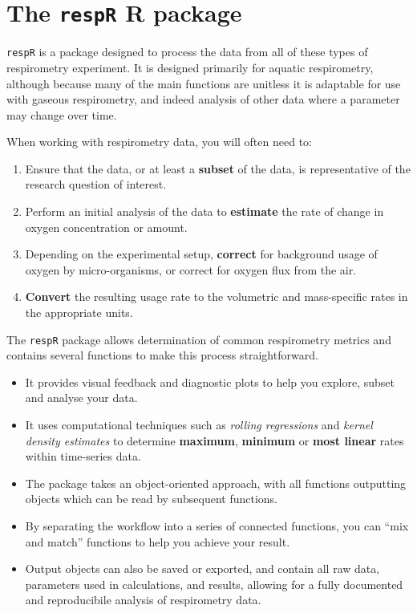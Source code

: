 \documentclass[]{book}
\providecommand{\tightlist}{%
  \setlength{\itemsep}{0pt}\setlength{\parskip}{0pt}}
\begin{document}
\section{\texorpdfstring{The \texttt{respR} R
package}{The respR R package}}\label{the-respr-r-package}

\texttt{respR} is a package designed to process the data from all of
these types of respirometry experiment. It is designed primarily for
aquatic respirometry, although because many of the main functions are
unitless it is adaptable for use with gaseous respirometry, and indeed
analysis of other data where a parameter may change over time.

When working with respirometry data, you will often need to:

\begin{enumerate}
\def\labelenumi{\arabic{enumi}.}
\tightlist
\item
  Ensure that the data, or at least a \textbf{subset} of the data, is
  representative of the research question of interest.
\item
  Perform an initial analysis of the data to \textbf{estimate} the rate
  of change in oxygen concentration or amount.
\item
  Depending on the experimental setup, \textbf{correct} for background
  usage of oxygen by micro-organisms, or correct for oxygen flux from
  the air.
\item
  \textbf{Convert} the resulting usage rate to the volumetric and
  mass-specific rates in the appropriate units.
\end{enumerate}

The \texttt{respR} package allows determination of common respirometry
metrics and contains several functions to make this process
straightforward.

\begin{itemize}
\tightlist
\item
  It provides visual feedback and diagnostic plots to help you explore,
  subset and analyse your data.
\item
  It uses computational techniques such as \emph{rolling regressions}
  and \emph{kernel density estimates} to determine \textbf{maximum},
  \textbf{minimum} or \textbf{most linear} rates within time-series
  data.
\item
  The package takes an object-oriented approach, with all functions
  outputting objects which can be read by subsequent functions.
\item
  By separating the workflow into a series of connected functions, you
  can ``mix and match'' functions to help you achieve your result.
\item
  Output objects can also be saved or exported, and contain all raw
  data, parameters used in calculations, and results, allowing for a
  fully documented and reproducibile analysis of respirometry data.
\end{itemize}
\end{document}
